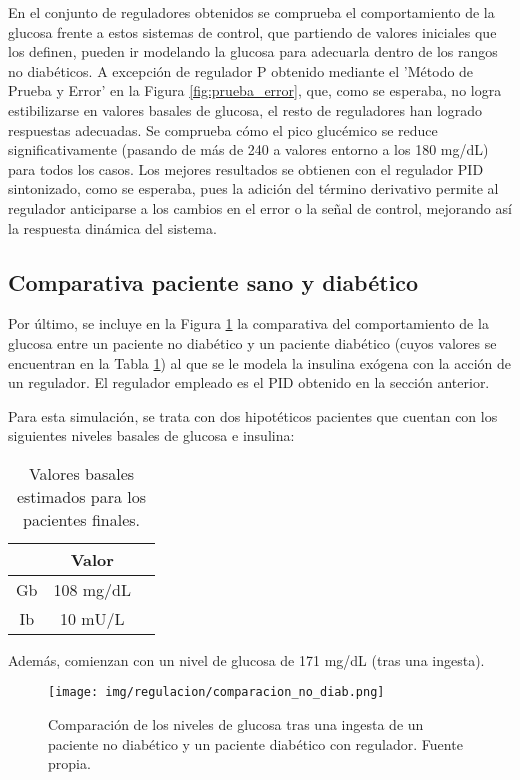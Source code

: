 En el conjunto de reguladores obtenidos se comprueba el comportamiento de la glucosa frente a estos sistemas de control, que partiendo de valores iniciales que los definen, pueden ir modelando la glucosa para adecuarla dentro de los rangos no diabéticos.
A excepción de regulador P obtenido mediante el 'Método de Prueba y Error' en la Figura \ref{fig:prueba_error}, que, como se esperaba, no logra estibilizarse en valores basales de glucosa, el resto de reguladores han logrado respuestas adecuadas. Se comprueba cómo el pico glucémico se reduce significativamente (pasando de más de 240 a valores entorno a los 180 mg/dL) para todos los casos. Los mejores resultados se obtienen con el regulador PID sintonizado, como se esperaba, pues la adición del término derivativo permite al regulador anticiparse a los cambios en el error o la señal de control, mejorando así la respuesta dinámica del sistema. 

\subsection{Comparativa paciente sano y diabético}

Por último, se incluye en la Figura \ref{fig:comparacion_diab_no_diab} la comparativa del comportamiento de la glucosa entre un paciente no diabético y un paciente diabético (cuyos valores se encuentran en la Tabla \ref{tab:valores_finales_paciente}) al que se le modela la insulina exógena con la acción de un regulador.
El regulador empleado es el PID obtenido en la sección anterior.

Para esta simulación, se trata con dos hipotéticos pacientes que cuentan con los siguientes niveles basales de glucosa e insulina:

\begin{table}[htbp]
    \centering
    \caption{Valores basales estimados para los pacientes finales.}
    \begin{tabular}{|c|c|c|}
        \hline
          & Valor\\
        \hline
        Gb & 108 mg/dL \\
        Ib & 10 mU/L  \\
        \hline
    \end{tabular}
    \label{tab:valores_finales_paciente}
\end{table}

Además, comienzan con un nivel de glucosa de 171 mg/dL (tras una ingesta).

\begin{figure}[htbp]
    \centering
    \texttt{[image: img/regulacion/comparacion\_no\_diab.png]}
    \caption{Comparación de los niveles de glucosa tras una ingesta de un paciente no diabético y un paciente diabético con regulador. Fuente propia.}
    \label{fig:comparacion_diab_no_diab}
\end{figure}

